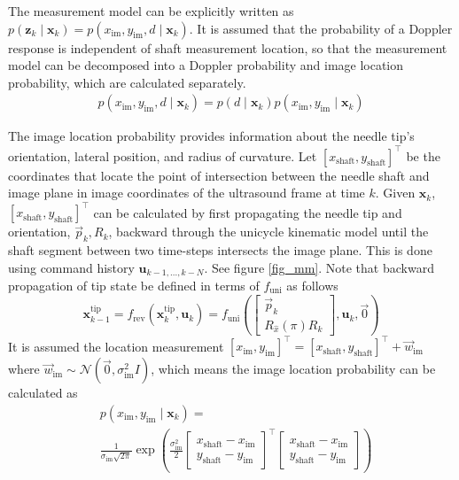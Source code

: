 \documentclass[journal,transmag]{IEEEtran}
\newcommand{\bvar}[2]{\mathbf{#1}_{#2}}
\newcommand{\meas}[1][k]{p(\mathbf{z}_{#1} \mid \mathbf{x}_{#1})}
\newcommand{\unistate}[2]{\mathbf{#1}^{\text{tip}}_{#2}}
\begin{document}
The measurement model can be explicitly written as $\meas = p(x_{\text{im}}, y_{\text{im}}, d \mid \bvar{x}{k})$.  It is assumed that the probability of a Doppler response is independent of shaft measurement location, so that the measurement model can be decomposed into a Doppler probability and image location probability, which are calculated separately. 
\begin{align*}
p(x_{\text{im}}, y_{\text{im}}, d \mid \bvar{x}{k}) = p(d \mid \bvar{x}{k}) p(x_{\text{im}}, y_{\text{im}} \mid \bvar{x}{k})
\end{align*}

The image location probability provides information about the needle tip's orientation, lateral position, and radius of curvature.  Let $[x_{\text{shaft}}, y_{\text{shaft}}]^\top$ be the coordinates that locate the point of intersection between the needle shaft and image plane in image coordinates of the ultrasound frame at time $k$.  Given $\bvar{x}{k}$, $[x_{\text{shaft}}, y_{\text{shaft}}]^\top$ can be calculated by first propagating the needle tip and orientation, $\vec{p}_k, R_k$, backward through the unicycle kinematic model until the shaft segment between two time-steps intersects the image plane. This is done using command history $\bvar{u}{k-1,...,k-N}$.  See figure \ref{fig_mm}.  Note that backward propagation of tip state be defined in terms of $f_{\text{uni}}$ as follows
\begin{equation*}
\unistate{x}{k-1} = f_{\text{rev}}(\unistate{x}{k}, \bvar{u}{k}) = f_{\text{uni}}\left(\begin{bmatrix}\vec{p}_k \\ R_{\hat{x}}(\pi) R_k \end{bmatrix}, \bvar{u}{k}, \vec{0}\right)
\end{equation*}
It is assumed the location measurement $\left[x_{\text{im}}, y_{\text{im}}\right]^\top = [x_{\text{shaft}}, y_{\text{shaft}}]^\top + \vec{w}_{\text{im}}$ where $\vec{w}_{\text{im}} \sim \mathcal{N}(\vec{0}, \sigma_{\text{im}}^2 I)$, which means the image location probability can be calculated as  
\begin{align*}
& p(x_{\text{im}},y_{\text{im}} \mid \bvar{x}{k}) = \\
&\frac{1}{\sigma_{\text{im}} \sqrt{2 \pi}} \exp \left(\frac{\sigma_{\text{im}}^2}{2} \begin{bmatrix}x_{\text{shaft}}-x_{\text{im}} \\ y_{\text{shaft}}-y_{\text{im}} \end{bmatrix}^\top \begin{bmatrix}x_{\text{shaft}}-x_{\text{im}} \\ y_{\text{shaft}}-y_{\text{im}} \end{bmatrix} \right)
\end{align*} 
\end{document}
